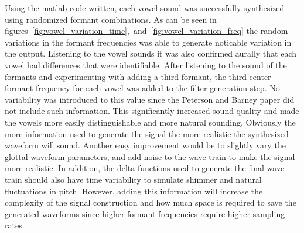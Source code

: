 \documentclass{article}
\begin{document}
Using the matlab code written, each vowel sound was successfully synthesized using randomized formant combinations. As can be seen in figures~\ref{fig:vowel_variation_time},~and~\ref{fig:vowel_variation_freq} the random variations in the formant frequencies was able to generate noticable variation in the output. Listening to the vowel sounds it was also confirmed aurally that each vowel had differences that were identifiable. After listening to the sound of the formants and experimenting with adding a third formant, the third center formant frequency for each vowel was added to the filter generation step. No variability was introduced to this value since the Peterson and Barney paper did not include such information. This significantly increased sound quality and made the vowels more easily distinguishable and more natural sounding. Obviously the more information used to generate the signal the more realistic the synthesized waveform will sound. Another easy improvement would be to slightly vary the glottal waveform parameters, and add noise to the wave train to make the signal more realistic. In addition, the delta functions used to generate the final wave train should also have time variability to simulate shimmer and natural fluctuations in pitch. However, adding this information will increase the complexity of the signal construction and how much space is required to save the generated waveforms since higher formant frequencies require higher sampling rates. 
\pagebreak


\end{document}
